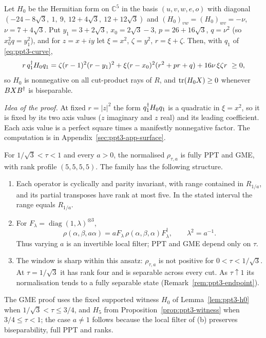 \begin{lemma}\label{lem:ppt3-h0}
Let $H_0$ be the Hermitian form on $\mathbb C^5$ in the basis $(u,v,w,e,o)$ with diagonal
$(-24-8\sqrt3,\ 1,\ 9,\ 12+4\sqrt3,\ 12+12\sqrt3)$ and $(H_0)_{vw}=(H_0)_{wv}=-\nu$, $\nu=7+4\sqrt3$. Put
$y_1=3+2\sqrt3$, $x_0=2\sqrt3-3$, $p=26+16\sqrt3$, $q=\nu^2$ (so $x_0^2q=y_1^2$), and for $z=x+iy$ let $\xi=x^2$,
$\zeta=y^2$, $r=\xi+\zeta$. Then, with $q_1$ of \eqref{eq:ppt3-curve},
\begin{equation}\label{eq:ppt3-h0}
r\,q_1\dg H_0q_1=\zeta(r-1)^2(r-y_1)^2+\xi(r-x_0)^2(r^2+pr+q)+16\nu\,\xi\zeta r\ \ge0 ,
\end{equation}
so $H_0$ is nonnegative on all cut-product rays of $R$, and $\operatorname{tr}(H_0X)\ge0$ whenever $BXB^{\dagger}$ is biseparable.
\end{lemma}
\emph{Idea of the proof.} At fixed $r=|z|^2$ the form $q_1^{\dagger} H_0q_1$ is a quadratic in $\xi=x^2$, so it is fixed by its two axis values
($z$ imaginary and $z$ real) and its leading coefficient. Each axis value is a perfect square times a manifestly nonnegative factor.
The computation is in Appendix~\ref{sec:ppt3-app-surface}.

\begin{theorem}\label{thm:ppt3-orbit}
For $1/\sqrt3<\tau<1$ and every $a>0$, the normalised
$\rho_{\tau,a}$ is fully PPT and GME, with rank profile
$(5,5,5,5)$. The family has the following structure.
\begin{enumerate}[label=(\alph*)]
\item Each operator is cyclically and parity invariant,
with range contained in $R_{1/a}$, and its partial
transposes have rank at most five. In the stated interval
the range equals $R_{1/a}$.
\item For $F_\lambda=\operatorname{diag}(1,\lambda)^{\otimes3}$,
\[
\rho(\alpha,\beta,a\alpha)
=aF_\lambda\,\rho(\alpha,\beta,\alpha)F_\lambda^\dagger,
\qquad \lambda^2=a^{-1}.
\]
Thus varying $a$ is an invertible local filter;
PPT and GME depend only on $\tau$.
\item The window is sharp within this ansatz:
$\rho_{\tau,a}$ is not positive for $0<\tau<1/\sqrt3$.
At $\tau=1/\sqrt3$ it has rank four and is separable
across every cut. As $\tau\uparrow1$ its normalisation
tends to a fully separable state
(Remark~\ref{rem:ppt3-endpoint}).
\end{enumerate}
The GME proof uses the fixed supported witness $H_0$
of Lemma~\ref{lem:ppt3-h0} when $1/\sqrt3<\tau\le3/4$, and
$H_5$ from Proposition~\ref{prop:ppt3-witness}
when $3/4\le\tau<1$; the case $a\ne1$ follows because the local filter of (b)
preserves biseparability, full PPT and ranks.
\end{theorem}

